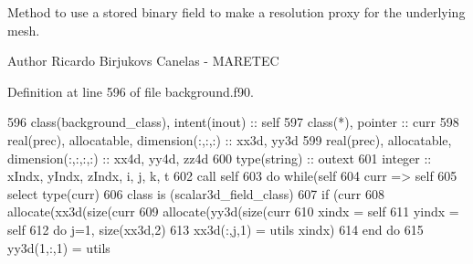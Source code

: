 Method to use a stored binary field to make a resolution proxy for the underlying mesh. 

\begin{DoxyAuthor}{Author}
Ricardo Birjukovs Canelas -\/ M\+A\+R\+E\+T\+EC 
\end{DoxyAuthor}


Definition at line 596 of file background.\+f90.


\begin{DoxyCode}
596     \textcolor{keywordtype}{class}(background\_class), \textcolor{keywordtype}{intent(inout)} :: self
597     \textcolor{keywordtype}{class}(*), \textcolor{keywordtype}{pointer} :: curr
598     \textcolor{keywordtype}{real(prec)}, \textcolor{keywordtype}{allocatable}, \textcolor{keywordtype}{dimension(:,:,:)} :: xx3d, yy3d
599     \textcolor{keywordtype}{real(prec)}, \textcolor{keywordtype}{allocatable}, \textcolor{keywordtype}{dimension(:,:,:,:)} :: xx4d, yy4d, zz4d
600     \textcolor{keywordtype}{type}(string) :: outext
601     \textcolor{keywordtype}{integer} :: xIndx, yIndx, zIndx, i, j, k, t
602     \textcolor{keyword}{call }self%
603     \textcolor{keywordflow}{do} \textcolor{keywordflow}{while}(self%
604         curr => self%
605         \textcolor{keywordflow}{select type}(curr)
606 \textcolor{keywordflow}{        class is} (scalar3d\_field\_class)
607             \textcolor{keywordflow}{if} (curr%
608                 \textcolor{keyword}{allocate}(xx3d(\textcolor{keyword}{size}(curr%
609                 \textcolor{keyword}{allocate}(yy3d(\textcolor{keyword}{size}(curr%
610                 xindx = self%
611                 yindx = self%
612                 \textcolor{keywordflow}{do} j=1, \textcolor{keyword}{size}(xx3d,2)
613                     xx3d(:,j,1) = utils%
      xindx)%
614 \textcolor{keywordflow}{                end do}
615                 yy3d(1,:,1) = utils%

\end{DoxyCode}
